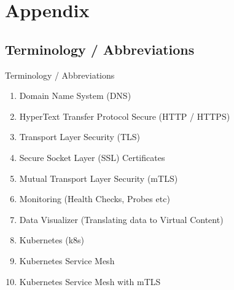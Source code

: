 \section{Appendix} \label{sec:appendix}
\subsection{Terminology / Abbreviations}\label{subsec:appendix-terminology-abbreviations}

\begin{frame}{Terminology / Abbreviations}
	\begin{enumerate}
		\item Domain Name System (DNS)
		\item HyperText Transfer Protocol Secure (HTTP / HTTPS)
		\item Transport Layer Security (TLS)
		\item Secure Socket Layer (SSL) Certificates
		\item Mutual Transport Layer Security (mTLS)
		\item Monitoring (Health Checks, Probes etc)
		\item Data Visualizer (Translating data to Virtual Content)
		\item Kubernetes (k8s)
		\item Kubernetes Service Mesh
		\item Kubernetes Service Mesh with mTLS
	\end{enumerate}
\end{frame}